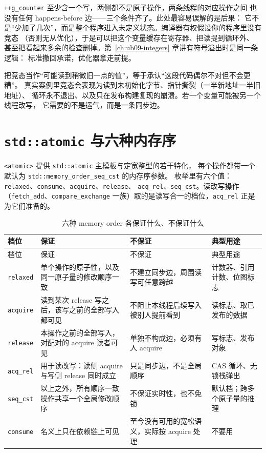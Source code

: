 \documentclass[12pt,a4paper,fontset=fandol]{ctexbook}
\newcommand{\Tp}[1]{\texttt{#1}}
\newcommand{\Hdr}[1]{\texttt{<#1>}}
\begin{document}
\Tp{++g\_counter} 至少含一个写，两侧都不是原子操作，两条线程的对应操作之间
也没有任何 happens-before 边——三个条件齐了。此处最容易误解的是后果：
它不是“少加了几次”，而是整个程序进入未定义状态。编译器有权假设你的程序里没有竞态
（否则无从优化），于是可以把这个变量缓存在寄存器、把读提到循环外、
甚至把看起来多余的检查删掉。第~\ref{ch:ub09-integers} 章讲有符号溢出时是同一条逻辑：
标准撤回承诺，优化器拿走前提。

\begin{warning}[title={“结果只是旧值”是最危险的自我安慰}]
把竞态当作“可能读到稍微旧一点的值”，等于承认“这段代码偶尔不对但不会更糟”。
真实案例里竞态会表现为读到未初始化字节、指针撕裂（一半新地址一半旧地址）、
循环永不退出、以及只在发布构建复现的崩溃。若一个变量可能被另一个线程改写，
它需要的不是运气，而是一条同步边。
\end{warning}

\section{\Tp{std::atomic} 与六种内存序}\label{sec:ub10-order}

\Hdr{atomic} 提供 \Tp{std::atomic} 主模板与定宽整型的若干特化，
每个操作都带一个默认为 \Tp{std::memory\_order\_seq\_cst} 的内存序参数。
枚举里有六个值：\Tp{relaxed}、\Tp{consume}、\Tp{acquire}、\Tp{release}、
\Tp{acq\_rel}、\Tp{seq\_cst}。读改写操作（\Tp{fetch\_add}、\Tp{compare\_exchange}
一族）取的是读写合一的档位，\Tp{acq\_rel} 正是为它们准备的。

\begin{longtable}{@{}>{\raggedright\arraybackslash}p{} >{\raggedright\arraybackslash}p{} >{\raggedright\arraybackslash}p{} >{\raggedright\arraybackslash}p{}@{}}
\caption{六种 memory order 各保证什么、不保证什么}\label{tab:ub10-orders}\\
\toprule
档位 & 保证 & 不保证 & 典型用途 \\
\midrule
\endfirsthead
\toprule
档位 & 保证 & 不保证 & 典型用途 \\
\midrule
\endhead
\bottomrule
\endfoot
\Tp{relaxed} & 单个操作的原子性，以及同一原子量的修改顺序一致 & 不建立同步边，周围读写可任意跨越 & 计数器、引用计数、位图标志 \\
\Tp{acquire} & 读到某次 release 写之后，该写之前的全部写入都可见 & 不阻止本线程后续写入被别人提前看到 & 读标志、取已发布的数据 \\
\Tp{release} & 本操作之前的全部写入，对配对的 acquire 读者可见 & 单独不构成边，必须有人 acquire & 写标志、发布对象 \\
\Tp{acq\_rel} & 用于读改写：读侧 acquire 与写侧 release 同时成立 & 只是同步边，不是全局顺序 & CAS 循环、无锁栈弹出 \\
\Tp{seq\_cst} & 以上之外，所有顺序一致操作共享一个全局修改顺序 & 不保证实时性，也不免锁 & 默认档；跨多个原子量的推理 \\
\Tp{consume} & 名义上只在依赖链上可见 & 至今没有可用的宽松语义，实际按 acquire 处理 & 不要用 \\
\end{longtable}
\end{document}
